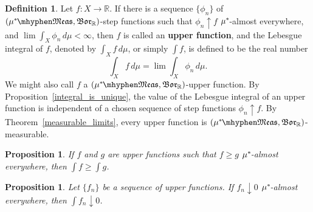 \documentclass[
twoside=true,
paper=letter,
fontsize=9pt,
pagesize=auto,
leqno,
openany,
headsepline,
overfullrule,
]{scrbook}
\theoremstyle{plain}
\theoremstyle{plain}
\newtheorem{prop}[thm]{Proposition}
\theoremstyle{definition}
\newtheorem{defn}[thm]{Definition}
\theoremstyle{bfnoteitalic}
\theoremstyle{bfnoteroman}
\newcommand{\term}[1]{\textbf{#1}\index{#1}}
\newcommand{\borel}{\mathfrak{Bor}}
\newcommand{\R}{\mathbb{R}}
\newcommand{\measurable}[1]{{#1}\mhyphen\mathfrak{Meas}}
\newcommand{\kernast}{\ast\kern-1pt}
\newcommand{\mbmeasurable}{$(\measurable{\measure^\kernast},\borel_\R)$\hyp{}measurable}
\newcommand{\funcf}{f}
\newcommand{\measurespace}{X}
\newcommand{\measure}{\mu}
\begin{document}
\begin{defn}\label{upperfunction}
Let $f:\measurespace\to\R$.  If there is a sequence $\{\phi_n\}$ of $(\measurable{\measure^\kernast}, \borel_\R)$-step functions such that $\phi_n\uparrow f$ $\measure^\kernast$-almost everywhere, and $\lim \int_\measurespace\phi_n\,d\measure < \infty$, then $f$ is called an \term{upper function}, and the Lebesgue integral  of $f$, denoted by $\int_\measurespace f\, d\measure$, or simply $\int f$, is  defined to be the real number
\[
\int_\measurespace f\, d\measure
=
\lim \int_\measurespace\phi_n\,d\measure.
\]
We might also call $\funcf$ a
$(\measurable{\measure^\kernast}, \borel_\R)$-upper function.
By Proposition~\ref{integral_is_unique}, the value of the Lebesgue integral of an upper function is independent of a chosen sequence of step functions 
$\phi_n\uparrow f$.
By Theorem~\ref{measurable_limits}, every upper function is \mbmeasurable.
\end{defn}


\begin{prop}
If $f$ and $g$ are upper functions such that $f\geq g$ $\measure^\kernast$-almost everywhere, then 
$\int f \geq \int g$.
\end{prop}



\begin{prop}
Let $\{f_n\}$ be a sequence of upper functions.  If $f_n\downarrow 0$ $\measure^\kernast$-almost everywhere, then $\int f_n\downarrow 0$.
\end{prop}
\end{document}
